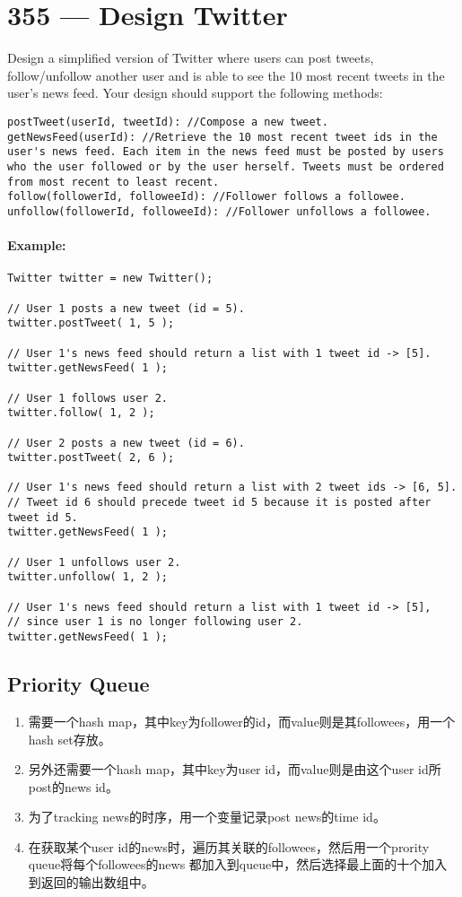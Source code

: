 \section{355 --- Design Twitter}
Design a simplified version of Twitter where users can post tweets, follow/unfollow another user and is able to see the 10 most recent tweets in the user's news feed. Your design should support the following methods:

\begin{lstlisting}[style=customc]
postTweet(userId, tweetId): //Compose a new tweet.
getNewsFeed(userId): //Retrieve the 10 most recent tweet ids in the user's news feed. Each item in the news feed must be posted by users who the user followed or by the user herself. Tweets must be ordered from most recent to least recent.
follow(followerId, followeeId): //Follower follows a followee.
unfollow(followerId, followeeId): //Follower unfollows a followee.
\end{lstlisting}


\paragraph{Example:}

\begin{lstlisting}[style=customc]
Twitter twitter = new Twitter();

// User 1 posts a new tweet (id = 5).
twitter.postTweet( 1, 5 );

// User 1's news feed should return a list with 1 tweet id -> [5].
twitter.getNewsFeed( 1 );

// User 1 follows user 2.
twitter.follow( 1, 2 );

// User 2 posts a new tweet (id = 6).
twitter.postTweet( 2, 6 );

// User 1's news feed should return a list with 2 tweet ids -> [6, 5].
// Tweet id 6 should precede tweet id 5 because it is posted after tweet id 5.
twitter.getNewsFeed( 1 );

// User 1 unfollows user 2.
twitter.unfollow( 1, 2 );

// User 1's news feed should return a list with 1 tweet id -> [5],
// since user 1 is no longer following user 2.
twitter.getNewsFeed( 1 );
\end{lstlisting}

\subsection{Priority Queue}
\begin{enumerate}
\item 需要一个hash map，其中key为follower的id，而value则是其followees，用一个hash set存放。
\item 另外还需要一个hash map，其中key为user id，而value则是由这个user id所post的news id。
\item 为了tracking news的时序，用一个变量记录post news的time id。
\item 在获取某个user id的news时，遍历其关联的followees，然后用一个prority queue将每个followees的news 都加入到queue中，然后选择最上面的十个加入到返回的输出数组中。
\end{enumerate}

